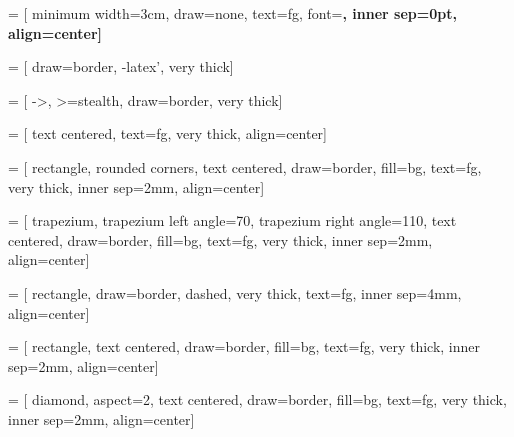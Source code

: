 \usepackage{tikz} %
\usetikzlibrary{arrows, backgrounds, calc, decorations.pathreplacing, fit, math, mindmap, positioning, shapes, shapes.geometric, tikzmark}


\newcommand{\drawhexagon}[5]{
    \node[rounded corners, inner sep=0, ultra thick, regular polygon, regular polygon sides=6, minimum size=#3, rotate=#4, #5] at (#2) {#1}
}

\newcommand{\drawtext}[5]{
    \node[left, bg, rounded corners, minimum width=\paperwidth, minimum height=#3, text width=\paperwidth, rotate=#4, #5] at (#2){#1}
}

\newcommand\pentagonvertex[5]{
    ({#1 + #3*cos(72*#5 + #4)},%
     {#2 + #3*sin(72*#5 + #4)})%
}


 = [
    minimum width=3cm,
    draw=none,
    text=fg,
    font=\bf,
    inner sep=0pt,
    align=center]

 = [
    draw=border,
    -latex',
    very thick]

 = [
    ->,
    >=stealth,
    draw=border,
    very thick]

 = [
    text centered,
    text=fg,
    very thick,
    align=center]

 = [
    rectangle,
    rounded corners,
    text centered,
    draw=border,
    fill=bg,
    text=fg,
    very thick,
    inner sep=2mm,
    align=center]

 = [
    trapezium,
    trapezium left angle=70,
    trapezium right angle=110,
    text centered,
    draw=border,
    fill=bg,
    text=fg,
    very thick,
    inner sep=2mm,
    align=center]

 = [
    rectangle,
    draw=border,
    dashed,
    very thick,
    text=fg,
    inner sep=4mm,
    align=center]

 = [
    rectangle,
    text centered,
    draw=border,
    fill=bg,
    text=fg,
    very thick,
    inner sep=2mm,
    align=center]

 = [
    diamond,
    aspect=2,
    text centered,
    draw=border,
    fill=bg,
    text=fg,
    very thick,
    inner sep=2mm,
    align=center]
